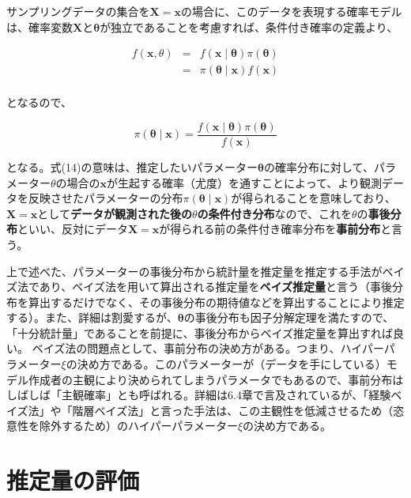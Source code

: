 \documentclass[a4paper,dvipdfmx]{jsarticle}
\begin{document}
サンプリングデータの集合を$\bm{X} = \bm{x}$の場合に、このデータを表現する確率モデルは、確率変数$\bm{X}$と$\bm{\theta}$が独立であることを考慮すれば、条件付き確率の定義より、

\begin{eqnarray*}
  f(\bm{x}, \theta) &=& f(\bm{x} \mid \bm{\theta})\pi(\bm{\theta}) \\
  &=& \pi(\bm{\theta} \mid \bm{x})f(\bm{x}) \\
\end{eqnarray*}

となるので、

\begin{equation}
  \pi(\bm{\theta} \mid \bm{x}) = \frac{f(\bm{x} \mid \bm{\theta})\pi(\bm{\theta})}{f(\bm{x})}
\end{equation}

となる。式(14)の意味は、推定したいパラメーター$\bm{\theta}$の確率分布に対して、パラメーター$\theta$の場合の$\bm{x}$が生起する確率（尤度）を通すことによって、より観測データを反映させたパラメーターの分布$\pi(\bm{\theta} \mid \bm{x})$が得られることを意味しており、$\bm{X}=\bm{x}$として\textbf{データが観測された後の$\theta$の条件付き分布}なので、これを$\theta$の\textbf{事後分布}といい、反対にデータ$\bm{X}=\bm{x}$が得られる前の条件付き確率分布を\textbf{事前分布}と言う。

上で述べた、パラメーターの事後分布から統計量を推定量を推定する手法がベイズ法であり、ベイズ法を用いて算出される推定量を\textbf{ベイズ推定量}と言う（事後分布を算出するだけでなく、その事後分布の期待値などを算出することにより推定する）。また、詳細は割愛するが、$\bm{\theta}$の事後分布も因子分解定理を満たすので、「十分統計量」であることを前提に、事後分布からベイズ推定量を算出すれば良い。
ベイズ法の問題点として、事前分布の決め方がある。つまり、ハイパーパラメーター$\xi$の決め方である。このパラメーターが（データを手にしている）モデル作成者の主観により決められてしまうパラメータでもあるので、事前分布はしばしば「主観確率」とも呼ばれる。詳細は6.4章で言及されているが、「経験ベイズ法」や「階層ベイズ法」と言った手法は、この主観性を低減させるため（恣意性を除外するため）のハイパーパラメーター$\xi$の決め方である。



\section{推定量の評価}
\end{document}
